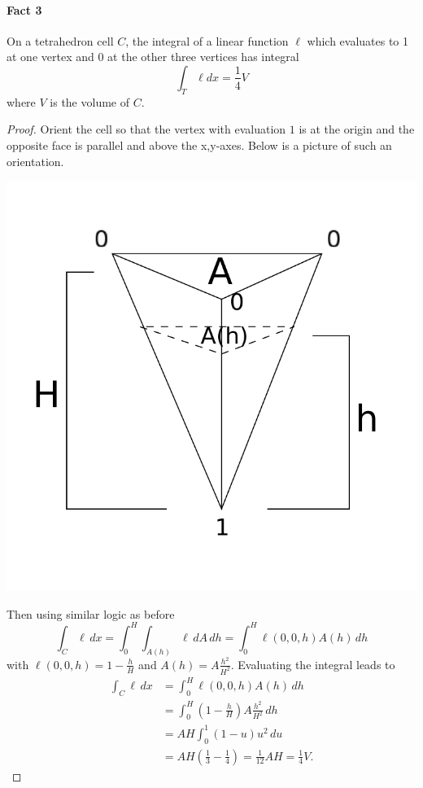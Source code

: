 \documentclass[12pt,letterpaper]{article}
\begin{document}
\paragraph{Fact 3}
On a tetrahedron cell $C$, the integral of a linear function $\ell$ which evaluates to 1 at one vertex and 0 at the other three vertices has integral
\begin{equation}
\int_T \ell dx = \frac{1}{4} V
\end{equation}
where $V$ is the volume of $C$.
\begin{proof}
Orient the cell so that the vertex with evaluation $1$ is at the origin and the opposite face is parallel and above the x,y-axes.
Below is a picture of such an orientation.
\begin{center}
\includegraphics[scale=0.6]{tet1.pdf}
\end{center}
Then using similar logic as before
\begin{equation}
\int_C \ell \, dx = \int_0^H \int_{A(h)} \ell \, dA \, dh = \int_0^H \ell(0,0,h) A(h) \, dh
\end{equation}
with $\ell(0,0,h) = 1 - \frac{h}{H}$ and $A(h) = A \frac{h^2}{H^2}$.
Evaluating the integral leads to
\begin{align*}
\int_C \ell \, dx &= \int_0^H \ell(0,0,h) A(h) \, dh \\
&= \int_0^H \left( 1 - \frac{h}{H} \right) A \frac{h^2}{H^2} \, dh \\
&= A H \int_0^1 (1 - u) u^2 \, du \\
&= A H \left( \frac{1}{3} - \frac{1}{4} \right) = \frac{1}{12} A H = \frac{1}{4} V.
\end{align*}
\end{proof}
\end{document}

